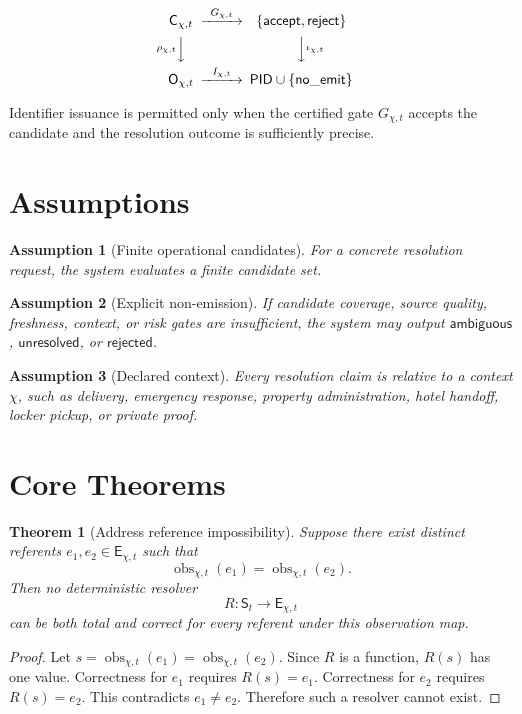 \documentclass[11pt]{article}
\newtheorem{assumption}{Assumption}
\newtheorem{theorem}{Theorem}
\newcommand{\Surf}{\mathsf{S}}
\newcommand{\Ent}{\mathsf{E}}
\newcommand{\Cand}{\mathsf{C}}
\newcommand{\Out}{\mathsf{O}}
\newcommand{\PID}{\mathsf{PID}}
\newcommand{\Ambiguous}{\mathsf{ambiguous}}
\newcommand{\Unresolved}{\mathsf{unresolved}}
\newcommand{\Rejected}{\mathsf{rejected}}
\begin{document}
\[
\begin{CD}
\Cand_{\chi,t} @>{G_{\chi,t}}>> \{\mathsf{accept},\mathsf{reject}\} \\
@V{\rho_{\chi,t}}VV @VV{\iota_{\chi,t}}V \\
\Out_{\chi,t} @>{I_{\chi,t}}>> \PID \cup \{\mathsf{no\_emit}\}
\end{CD}
\]

Identifier issuance is permitted only when the certified gate \(G_{\chi,t}\)
accepts the candidate and the resolution outcome is sufficiently precise.

\section{Assumptions}

\begin{assumption}[Finite operational candidates]
For a concrete resolution request, the system evaluates a finite candidate set.
\end{assumption}

\begin{assumption}[Explicit non-emission]
If candidate coverage, source quality, freshness, context, or risk gates are
insufficient, the system may output \(\Ambiguous\), \(\Unresolved\), or
\(\Rejected\).
\end{assumption}

\begin{assumption}[Declared context]
Every resolution claim is relative to a context \(\chi\), such as delivery,
emergency response, property administration, hotel handoff, locker pickup, or
private proof.
\end{assumption}

\section{Core Theorems}

\begin{theorem}[Address reference impossibility]
Suppose there exist distinct referents \(e_1,e_2 \in \Ent_{\chi,t}\) such that
\[
\operatorname{obs}_{\chi,t}(e_1)=\operatorname{obs}_{\chi,t}(e_2).
\]
Then no deterministic resolver
\[
R:\Surf_t\to\Ent_{\chi,t}
\]
can be both total and correct for every referent under this observation map.
\end{theorem}

\begin{proof}
Let \(s=\operatorname{obs}_{\chi,t}(e_1)=\operatorname{obs}_{\chi,t}(e_2)\).
Since \(R\) is a function, \(R(s)\) has one value. Correctness for \(e_1\)
requires \(R(s)=e_1\). Correctness for \(e_2\) requires \(R(s)=e_2\). This
contradicts \(e_1\ne e_2\). Therefore such a resolver cannot exist.
\end{proof}
\end{document}
